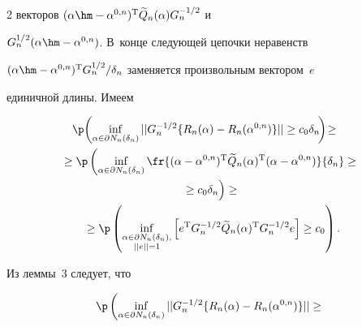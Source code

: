 \begin{multicols}{2}
векторов $(\alpha\hm-\alpha^{0,n})^{\mathrm{T}}\widetilde{Q}_n(\alpha)G_n^{-1/2}$ и 


$G_n^{1/2}(\alpha\hm-\alpha^{0,n})$. В~конце следующей цепочки неравенств 


$(\alpha\hm-\alpha^{0,n})^{\mathrm{T}}G_n^{1/2}/\delta_n$ заменяется произвольным вектором~$e$ 


единичной длины. Имеем


\begin{multline*}


\!\!\!\!\!\!\p\!\left(\inf\limits_{\alpha\in\partial N_n(\delta_n)}||G_n^{-1/2}\{R_n(\alpha)-


R_n(\alpha^{0,n})\}||\geq c_0\delta_n\!\right)\!\geq{}\hspace*{-1.26547pt}\\


{}\geq\p\left(\inf\limits_{\alpha\in\partial N_n(\delta_n)}\fr{


(\alpha-\alpha^{0,n})^{\mathrm{T}}\widetilde{Q}_n(\alpha)^{\mathrm{T}}(\alpha-\alpha^{0,n})}


{\delta_n}\geq{}\right.\\


\left.{}\geq c_0\delta_n


\vphantom{\fr{(\alpha-\alpha^{0,n})^{\mathrm{T}}\widetilde{Q}_n(\alpha)^{\mathrm{T}}(\alpha-\alpha^{0,n})}


{\delta_n}}


\right)\geq{}\\


{}\geq\p\left( \inf\limits_{\substack{{\alpha\in\partial N_n(\delta_n),}\\{||e||=1}}}


\left[e^{\mathrm{T}}G_n^{-1/2}\widetilde{Q}_n(\alpha)^{\mathrm{T}}G_n^{-1/2}e\right]\geq c_0\right).\hspace*{-1.757pt}




\end{multline*}





Из леммы~3 следует, что


\begin{multline}


\p\left(\inf\limits_{\alpha\in\partial N_n(\delta_n)}||G_n^{-1/2}\{R_n(\alpha)-


R_n(\alpha^{0,n})\}||\geq{}\right.\\



\end{multline}
\end{multicols}
